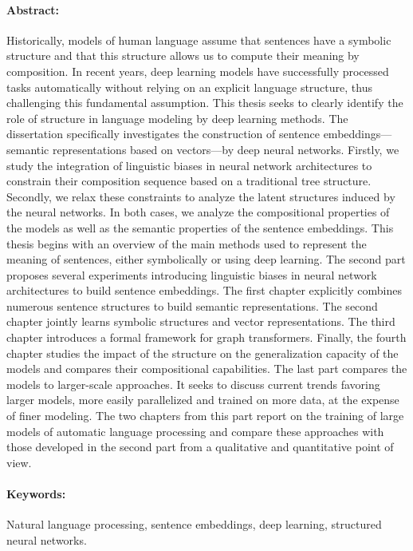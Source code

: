 \paragraph{Abstract:} Historically, models of human language assume that sentences have a symbolic structure and that this structure allows us to compute their meaning by composition. In recent years, deep learning models have successfully processed tasks automatically without relying on an explicit language structure, thus challenging this fundamental assumption. This thesis seeks to clearly identify the role of structure in language modeling by deep learning methods. The dissertation specifically investigates the construction of sentence embeddings—semantic representations based on vectors—by deep neural networks. Firstly, we study the integration of linguistic biases in neural network architectures to constrain their composition sequence based on a traditional tree structure. Secondly, we relax these constraints to analyze the latent structures induced by the neural networks. In both cases, we analyze the compositional properties of the models as well as the semantic properties of the sentence embeddings. This thesis begins with an overview of the main methods used to represent the meaning of sentences, either symbolically or using deep learning. The second part proposes several experiments introducing linguistic biases in neural network architectures to build sentence embeddings. The first chapter explicitly combines numerous sentence structures to build semantic representations. The second chapter jointly learns symbolic structures and vector representations. The third chapter introduces a formal framework for graph transformers. Finally, the fourth chapter studies the impact of the structure on the generalization capacity of the models and compares their compositional capabilities. The last part compares the models to larger-scale approaches. It seeks to discuss current trends favoring larger models, more easily parallelized and trained on more data, at the expense of finer modeling. The two chapters from this part report on the training of large models of automatic language processing and compare these approaches with those developed in the second part from a qualitative and quantitative point of view.

\paragraph{Keywords:} Natural language processing, sentence embeddings, deep learning, structured neural networks.

